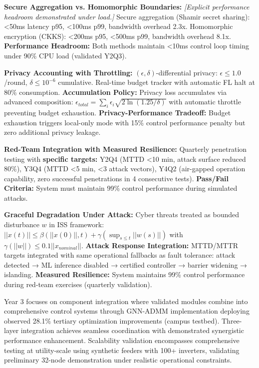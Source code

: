 \documentclass[12pt]{article}
\begin{document}
\textbf{Secure Aggregation vs. Homomorphic Boundaries:} \textit{[Explicit performance headroom demonstrated under load.]} Secure aggregation (Shamir secret sharing): <50ms latency p95, <100ms p99, bandwidth overhead 2.3x. Homomorphic encryption (CKKS): <200ms p95, <500ms p99, bandwidth overhead 8.1x. \textbf{Performance Headroom:} Both methods maintain <10ms control loop timing under 90\% CPU load (validated Y2Q3).

\textbf{Privacy Accounting with Throttling:} $(\epsilon, \delta)$-differential privacy: $\epsilon \leq 1.0$/round, $\delta \leq 10^{-6}$ cumulative. Real-time budget tracker with automatic FL halt at 80\% consumption. \textbf{Accumulation Policy:} Privacy loss accumulates via advanced composition: $\epsilon_{total} = \sum_i \epsilon_i \sqrt{2\ln(1.25/\delta)}$ with automatic throttle preventing budget exhaustion. \textbf{Privacy-Performance Tradeoff:} Budget exhaustion triggers local-only mode with 15\% control performance penalty but zero additional privacy leakage.

\textbf{Red-Team Integration with Measured Resilience:} Quarterly penetration testing with \textbf{specific targets:} Y2Q4 (MTTD <10 min, attack surface reduced 80\%), Y3Q4 (MTTD <5 min, <3 attack vectors), Y4Q2 (air-gapped operation capability, zero successful penetrations in 4 consecutive tests). \textbf{Pass/Fail Criteria:} System must maintain 99\% control performance during simulated attacks.

\textbf{Graceful Degradation Under Attack:} Cyber threats treated as bounded disturbance $w$ in ISS framework: $||x(t)|| \leq \beta(||x(0)||, t) + \gamma(\sup_{s \leq t} ||w(s)||)$ with $\gamma(||w||) \leq 0.1||x_{nominal}||$. \textbf{Attack Response Integration:} MTTD/MTTR targets integrated with same operational fallbacks as fault tolerance: attack detected → ML inference disabled → certified controller → barrier widening → islanding. \textbf{Measured Resilience:} System maintains 99\% control performance during red-team exercises (quarterly validation).

Year 3 focuses on component integration where validated modules combine into comprehensive control systems through GNN-ADMM implementation deploying observed 28.1\% tertiary optimization improvements (campus testbed). Three-layer integration achieves seamless coordination with demonstrated synergistic performance enhancement. Scalability validation encompasses comprehensive testing at utility-scale using synthetic feeders with 100+ inverters, validating preliminary 32-node demonstration under realistic operational constraints.
\end{document}
